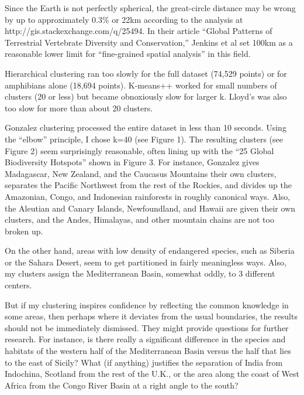 \documentclass[12pt, fullpage,letterpaper]{article}
\begin{document}
	Since the Earth is not perfectly spherical, the great-circle distance may be wrong by up to approximately 0.3\% or 22km according to the analysis at http://gis.stackexchange.com/q/25494. In their article “Global Patterns of Terrestrial Vertebrate Diversity and Conservation,” Jenkins et al set 100km as a reasonable lower limit for “fine-grained spatial analysis” in this field.
	
	Hierarchical clustering ran too slowly for the full dataset (74,529 points) or for amphibians alone (18,694 points). K-means++ worked for small numbers of clusters (20 or less) but became obnoxiously slow for larger k. Lloyd’s was also too slow for more than about 20 clusters.
	
	Gonzalez clustering processed the entire dataset in less than 10 seconds. Using the “elbow” principle, I chose k=40 (see Figure 1). The resulting clusters (see Figure 2) seem surprisingly reasonable, often lining up with the “25 Global Biodiversity Hotspots” shown in Figure 3. For instance, Gonzalez gives Madagascar, New Zealand, and the Caucasus Mountains their own clusters, separates the Pacific Northwest from the rest of the Rockies, and divides up the Amazonian, Congo, and Indonesian rainforests in roughly canonical ways. Also, the Aleutian and Canary Islands, Newfoundland, and Hawaii are given their own clusters, and the Andes, Himalayas, and other mountain chains are not too broken up. 
	
	On the other hand, areas with low density of endangered species, such as Siberia or the Sahara Desert, seem to get partitioned in fairly meaningless ways. Also, my clusters assign the Mediterranean Basin, somewhat oddly, to 3 different centers. 
	
	But if my clustering inspires confidence by reflecting the common knowledge in some areas, then perhaps where it deviates from the usual boundaries, the results should not be immediately dismissed. They might provide questions for further research. For instance, is there really a significant difference in the species and habitats of the western half of the Mediterranean Basin versus the half that lies to the east of Sicily? What (if anything) justifies the separation of India from Indochina, Scotland from the rest of the U.K., or the area along the coast of West Africa from the Congo River Basin at a right angle to the south?
	
\end{document}
